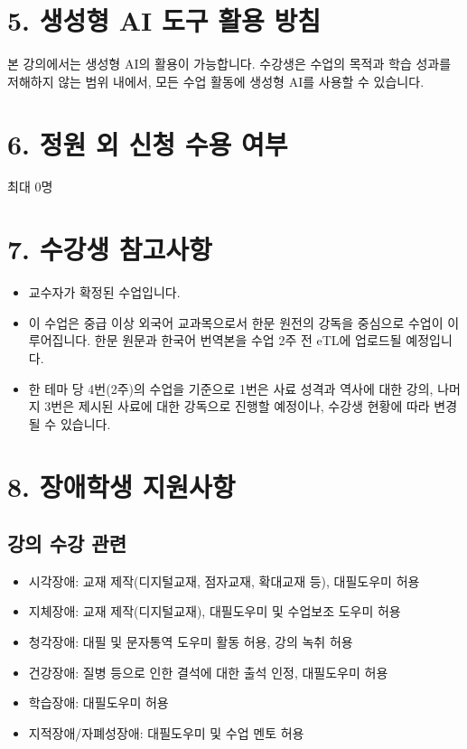\documentclass{article}
\begin{document}
\newpage
\section{5. 생성형 AI 도구 활용 방침}
\medskip
본 강의에서는 생성형 AI의 활용이 가능합니다. 수강생은 수업의 목적과 학습 성과를 저해하지 않는 범위 내에서, 모든 수업 활동에 생성형 AI를 사용할 수 있습니다.

\section{6. 정원 외 신청 수용 여부}
\medskip
최대 0명

\section{7. 수강생 참고사항}
\begin{itemize}
    \item 교수자가 확정된 수업입니다.
    \item 이 수업은 중급 이상 외국어 교과목으로서 한문 원전의 강독을 중심으로 수업이 이루어집니다. 한문 원문과 한국어 번역본을 수업 2주 전 eTL에 업로드될 예정입니다.
    \item 한 테마 당 4번(2주)의 수업을 기준으로 1번은 사료 성격과 역사에 대한 강의, 나머지 3번은 제시된 사료에 대한 강독으로 진행할 예정이나, 수강생 현황에 따라 변경될 수 있습니다. 
\end{itemize}

\section{8. 장애학생 지원사항}
\medskip
\subsection{강의 수강 관련}
\medskip
\begin{itemize}
    \item 시각장애: 교재 제작(디지털교재, 점자교재, 확대교재 등), 대필도우미 허용
    \item 지체장애: 교재 제작(디지털교재), 대필도우미 및 수업보조 도우미 허용
    \item 청각장애: 대필 및 문자통역 도우미 활동 허용, 강의 녹취 허용
    \item 건강장애: 질병 등으로 인한 결석에 대한 출석 인정, 대필도우미 허용
    \item 학습장애: 대필도우미 허용
    \item 지적장애/자폐성장애: 대필도우미 및 수업 멘토 허용
\end{itemize}
\end{document}
